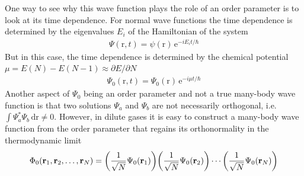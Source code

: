 \documentclass[11pt,a4paper,twoside]{article}
\renewcommand{\vec}[1]{\bm{\mathrm{#1}}}
\newcommand{\unit}[1]{\,\mathrm{#1}}
\begin{document}
			One way to see why this wave function plays the role of an order parameter is to look at its time dependence. For normal wave functions the time dependence is determined by the eigenvalues $E_i$ of the Hamiltonian of the system
			\begin{align}
				\Psi(\vec{r},t)=\psi(\vec{r})\,\mathrm{e}^{-iE_it/\hbar}
			\end{align}
			But in this case, the time dependence is determined by the chemical potential $\mu=E(N)-E(N-1)\approx \partial E/\partial N$
			\begin{align}
				\Psi_0(\vec{r},t)=\Psi_0(\vec{r})\,\mathrm{e}^{-i\mu t/\hbar}
			\end{align}
			Another aspect of $\Psi_0$ being an order parameter and not a true many-body wave function is that two solutions $\Psi_a$ and $\Psi_b$ are not necessarily orthogonal, i.e. $\int\!\Psi_a^*\Psi_b\unit{d}\vec{r}\neq 0$. However, in dilute gases it is easy to construct a many-body wave function from the order parameter that regains its orthonormality in the thermodynamic limit
			\begin{align}
				\Phi_0(\vec{r}_1,\vec{r}_2,\ldots,\vec{r}_N) = \qty(\frac{1}{\sqrt{N}}\Psi_0(\vec{r}_1))\qty(\frac{1}{\sqrt{N}}\Psi_0(\vec{r}_2))\cdots\qty(\frac{1}{\sqrt{N}}\Psi_0(\vec{r}_N))
			\end{align}
			
\end{document}
